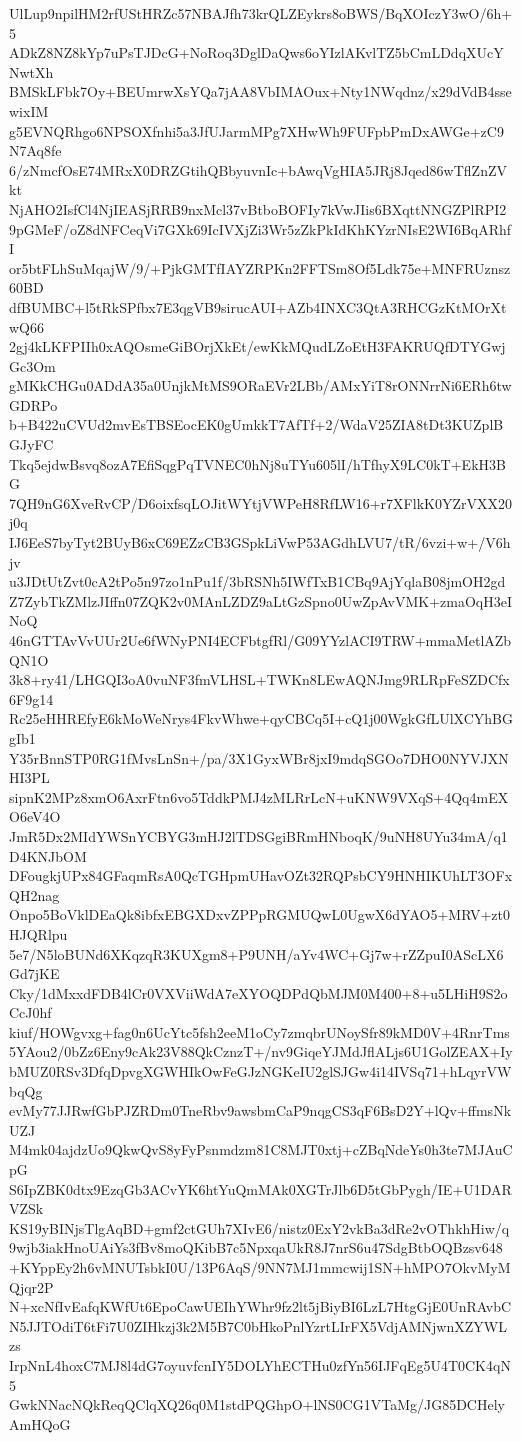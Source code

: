 UlLup9npilHM2rfUStHRZc57NBAJfh73krQLZEykrs8oBWS/BqXOIczY3wO/6h+5
ADkZ8NZ8kYp7uPsTJDcG+NoRoq3DglDaQws6oYIzlAKvlTZ5bCmLDdqXUcYNwtXh
BMSkLFbk7Oy+BEUmrwXsYQa7jAA8VbIMAOux+Nty1NWqdnz/x29dVdB4ssewixIM
g5EVNQRhgo6NPSOXfnhi5a3JfUJarmMPg7XHwWh9FUFpbPmDxAWGe+zC9N7Aq8fe
6/zNmcfOsE74MRxX0DRZGtihQBbyuvnIc+bAwqVgHIA5JRj8Jqed86wTflZnZVkt
NjAHO2IsfCl4NjIEASjRRB9nxMcl37vBtboBOFIy7kVwJIis6BXqttNNGZPlRPI2
9pGMeF/oZ8dNFCeqVi7GXk69IcIVXjZi3Wr5zZkPkIdKhKYzrNIsE2WI6BqARhfI
or5btFLhSuMqajW/9/+PjkGMTfIAYZRPKn2FFTSm8Of5Ldk75e+MNFRUznsz60BD
dfBUMBC+l5tRkSPfbx7E3qgVB9sirucAUI+AZb4INXC3QtA3RHCGzKtMOrXtwQ66
2gj4kLKFPIIh0xAQOsmeGiBOrjXkEt/ewKkMQudLZoEtH3FAKRUQfDTYGwjGc3Om
gMKkCHGu0ADdA35a0UnjkMtMS9ORaEVr2LBb/AMxYiT8rONNrrNi6ERh6twGDRPo
b+B422uCVUd2mvEsTBSEocEK0gUmkkT7AfTf+2/WdaV25ZIA8tDt3KUZplBGJyFC
Tkq5ejdwBsvq8ozA7EfiSqgPqTVNEC0hNj8uTYu605lI/hTfhyX9LC0kT+EkH3BG
7QH9nG6XveRvCP/D6oixfsqLOJitWYtjVWPeH8RfLW16+r7XFlkK0YZrVXX20j0q
IJ6EeS7byTyt2BUyB6xC69EZzCB3GSpkLiVwP53AGdhLVU7/tR/6vzi+w+/V6hjv
u3JDtUtZvt0cA2tPo5n97zo1nPu1f/3bRSNh5IWfTxB1CBq9AjYqlaB08jmOH2gd
Z7ZybTkZMlzJIffn07ZQK2v0MAnLZDZ9aLtGzSpno0UwZpAvVMK+zmaOqH3eINoQ
46nGTTAvVvUUr2Ue6fWNyPNI4ECFbtgfRl/G09YYzlACI9TRW+mmaMetlAZbQN1O
3k8+ry41/LHGQI3oA0vuNF3fmVLHSL+TWKn8LEwAQNJmg9RLRpFeSZDCfx6F9g14
Rc25eHHREfyE6kMoWeNrys4FkvWhwe+qyCBCq5I+cQ1j00WgkGfLUlXCYhBGgIb1
Y35rBnnSTP0RG1fMvsLnSn+/pa/3X1GyxWBr8jxI9mdqSGOo7DHO0NYVJXNHI3PL
sipnK2MPz8xmO6AxrFtn6vo5TddkPMJ4zMLRrLcN+uKNW9VXqS+4Qq4mEXO6eV4O
JmR5Dx2MIdYWSnYCBYG3mHJ2lTDSGgiBRmHNboqK/9uNH8UYu34mA/q1D4KNJbOM
DFougkjUPx84GFaqmRsA0QcTGHpmUHavOZt32RQPsbCY9HNHIKUhLT3OFxQH2nag
Onpo5BoVklDEaQk8ibfxEBGXDxvZPPpRGMUQwL0UgwX6dYAO5+MRV+zt0HJQRlpu
5e7/N5loBUNd6XKqzqR3KUXgm8+P9UNH/aYv4WC+Gj7w+rZZpuI0AScLX6Gd7jKE
Cky/1dMxxdFDB4lCr0VXViiWdA7eXYOQDPdQbMJM0M400+8+u5LHiH9S2oCcJ0hf
kiuf/HOWgvxg+fag0n6UcYtc5fsh2eeM1oCy7zmqbrUNoySfr89kMD0V+4RnrTms
5YAou2/0bZz6Eny9cAk23V88QkCznzT+/nv9GiqeYJMdJflALjs6U1GolZEAX+Iy
bMUZ0RSv3DfqDpvgXGWHIkOwFeGJzNGKeIU2glSJGw4i14IVSq71+hLqyrVWbqQg
evMy77JJRwfGbPJZRDm0TneRbv9awsbmCaP9nqgCS3qF6BsD2Y+lQv+ffmsNkUZJ
M4mk04ajdzUo9QkwQvS8yFyPsnmdzm81C8MJT0xtj+cZBqNdeYs0h3te7MJAuCpG
S6IpZBK0dtx9EzqGb3ACvYK6htYuQmMAk0XGTrJlb6D5tGbPygh/IE+U1DARVZSk
KS19yBINjsTlgAqBD+gmf2ctGUh7XIvE6/nistz0ExY2vkBa3dRe2vOThkhHiw/q
9wjb3iakHnoUAiYs3fBv8moQKibB7c5NpxqaUkR8J7nrS6u47SdgBtbOQBzsv648
+KYppEy2h6vMNUTsbkI0U/13P6AqS/9NN7MJ1mmcwij1SN+hMPO7OkvMyMQjqr2P
N+xcNfIvEafqKWfUt6EpoCawUEIhYWhr9fz2lt5jBiyBI6LzL7HtgGjE0UnRAvbC
N5JJTOdiT6tFi7U0ZIHkzj3k2M5B7C0bHkoPnlYzrtLIrFX5VdjAMNjwnXZYWLzs
IrpNnL4hoxC7MJ8l4dG7oyuvfcnIY5DOLYhECTHu0zfYn56IJFqEg5U4T0CK4qN5
GwkNNacNQkReqQClqXQ26q0M1stdPQGhpO+lNS0CG1VTaMg/JG85DCHelyAmHQoG
